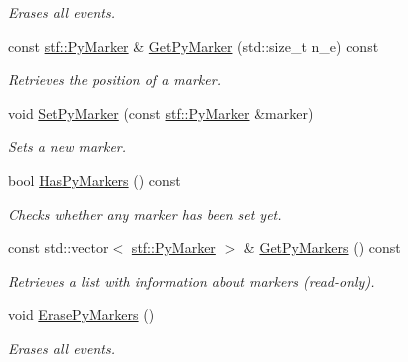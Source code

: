 \begin{DoxyCompactItemize}
\begin{DoxyCompactList}\small\item\em Erases all events. \item\end{DoxyCompactList}\item 
const \hyperlink{structstf_1_1PyMarker}{stf::PyMarker} \& \hyperlink{classSection_a6973cb8f0221bcf14c1340d250a65b8d}{GetPyMarker} (std::size\_\-t n\_\-e) const 
\begin{DoxyCompactList}\small\item\em Retrieves the position of a marker. \item\end{DoxyCompactList}\item 
void \hyperlink{classSection_a46c0073052679f46ce54da0a3a3fce21}{SetPyMarker} (const \hyperlink{structstf_1_1PyMarker}{stf::PyMarker} \&marker)
\begin{DoxyCompactList}\small\item\em Sets a new marker. \item\end{DoxyCompactList}\item 
bool \hyperlink{classSection_ad774d7ea6f7b5c5db422b61aaee9c755}{HasPyMarkers} () const 
\begin{DoxyCompactList}\small\item\em Checks whether any marker has been set yet. \item\end{DoxyCompactList}\item 
const std::vector$<$ \hyperlink{structstf_1_1PyMarker}{stf::PyMarker} $>$ \& \hyperlink{classSection_a9f049021e522755e1eb72b723e71a1f5}{GetPyMarkers} () const 
\begin{DoxyCompactList}\small\item\em Retrieves a list with information about markers (read-\/only). \item\end{DoxyCompactList}\item 
\hypertarget{classSection_a296b4013f761b937d0ca47ab8c5da207}{
void \hyperlink{classSection_a296b4013f761b937d0ca47ab8c5da207}{ErasePyMarkers} ()}
\label{classSection_a296b4013f761b937d0ca47ab8c5da207}

\begin{DoxyCompactList}\small\item\em Erases all events. \item\end{DoxyCompactList}\end{DoxyCompactItemize}


